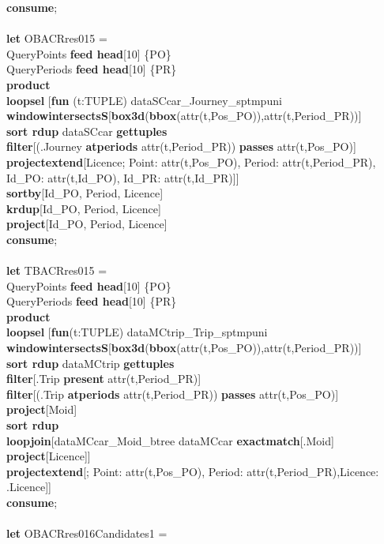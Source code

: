 \documentclass[a4paper]{article}
\newcommand{\op}[1]{\textbf{#1}}
\begin{document}
\begin{scriptsize}
\begin{tabbing}
\op{consume};\\
\\
\op{let} OBACRres015 =\\
\>QueryPoints  \op{feed head}[10] \{PO\}\\
\>QueryPeriods \op{feed head}[10] \{PR\}\\
\>\op{product}\\
\>\op{loopsel} [\op{fun} (t:TUPLE) dataSCcar\_Journey\_sptmpuni \op{windowintersectsS}[\op{box3d}(\op{bbox}(attr(t,Pos\_PO)),attr(t,Period\_PR))]\\
\>\>\op{sort rdup} dataSCcar \op{gettuples}\\
\>\>\op{filter}[(.Journey \op{atperiods} attr(t,Period\_PR)) \op{passes} attr(t,Pos\_PO)]\\
\>\>\op{projectextend}[Licence; Point: attr(t,Pos\_PO), Period: attr(t,Period\_PR), Id\_PO: attr(t,Id\_PO), Id\_PR: attr(t,Id\_PR)]]\\
\>\op{sortby}[Id\_PO, Period, Licence]\\
\>\op{krdup}[Id\_PO, Period, Licence]\\
\>\op{project}[Id\_PO, Period, Licence]\\
\op{consume};\\
\\
\op{let} TBACRres015 =\\
\>QueryPoints  \op{feed head}[10] \{PO\}\\
\>QueryPeriods \op{feed head}[10] \{PR\}\\
\>\op{product}\\
\>\op{loopsel} [\op{fun}(t:TUPLE) dataMCtrip\_Trip\_sptmpuni \op{windowintersectsS}[\op{box3d}(\op{bbox}(attr(t,Pos\_PO)),attr(t,Period\_PR))]\\
\>\>\op{sort rdup} dataMCtrip \op{gettuples}\\
\>\>\op{filter}[.Trip \op{present} attr(t,Period\_PR)]\\
\>\>\op{filter}[(.Trip \op{atperiods} attr(t,Period\_PR)) \op{passes} attr(t,Pos\_PO)]\\
\>\>\op{project}[Moid]\\
\>\>\op{sort rdup}\\
\>\>\op{loopjoin}[dataMCcar\_Moid\_btree dataMCcar \op{exactmatch}[.Moid] \op{project}[Licence]]\\
\>\>\op{projectextend}[; Point: attr(t,Pos\_PO), Period: attr(t,Period\_PR),Licence: .Licence]]\\
\op{consume};\\
\\
\op{let} OBACRres016Candidates1 =\\

\end{tabbing}
\end{scriptsize}
\end{document}
